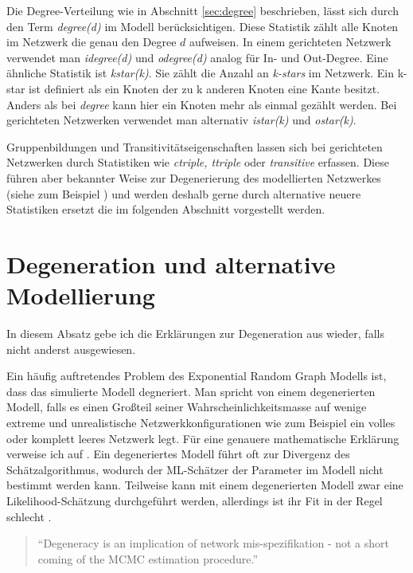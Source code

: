 \documentclass[a4paper,ngerman,oneside,titlepage,bibliography=totoc,11pt]{scrreprt}
\begin{document}
Die Degree-Verteilung wie in Abschnitt \ref{sec:degree} beschrieben, lässt sich durch den Term \textit{degree(d)} im Modell berücksichtigen. Diese Statistik zählt alle Knoten im Netzwerk die genau den Degree $d$ aufweisen. In einem gerichteten Netzwerk verwendet man \textit{idegree(d)} und \textit{odegree(d)} analog für In- und Out-Degree. Eine ähnliche Statistik ist \textit{kstar(k)}. Sie zählt die Anzahl an \emph{k-stars} im Netzwerk. Ein k-star ist definiert als ein Knoten der zu k anderen Knoten eine Kante besitzt. Anders als bei \textit{degree} kann hier ein Knoten mehr als einmal gezählt werden. Bei gerichteten Netzwerken verwendet man alternativ \textit{istar(k)} und \textit{ostar(k)}.

Gruppenbildungen und Transitivitätseigenschaften lassen sich bei gerichteten Netzwerken durch Statistiken wie \textit{ctriple, ttriple} oder \textit{transitive} erfassen. Diese führen aber bekannter Weise zur Degenerierung des modellierten Netzwerkes (siehe zum Beispiel \citep{morris2008specification, hunter2008ergm, handcock2008statnet}) und werden deshalb gerne durch alternative neuere Statistiken ersetzt die im folgenden Abschnitt vorgestellt werden.

\section{Degeneration und alternative Modellierung}
In diesem Absatz gebe ich die Erklärungen zur Degeneration aus \citep{handcock2008statnet}wieder, falls nicht anderst ausgewiesen.

Ein häufig auftretendes Problem des Exponential Random Graph Modells ist, dass das simulierte Modell degneriert. Man spricht von einem degenerierten Modell, falls es einen Großteil seiner Wahrscheinlichkeitsmasse auf wenige extreme und unrealistische Netzwerkkonfigurationen wie zum Beispiel ein volles oder komplett leeres Netzwerk legt. Für eine genauere mathematische Erklärung verweise ich auf \citep{handcock2003assessing}. Ein degeneriertes Modell führt oft zur Divergenz des Schätzalgorithmus, wodurch der ML-Schätzer der Parameter im Modell nicht bestimmt werden kann. Teilweise kann mit einem degenerierten Modell zwar eine Likelihood-Schätzung durchgeführt werden, allerdings ist ihr Fit in der Regel schlecht .

\begin{quote}
"`Degeneracy is an implication of network mis-spezifikation - not a short coming of the MCMC estimation procedure."'\citep{handcock2008statnet}
\end{quote}
\end{document}
